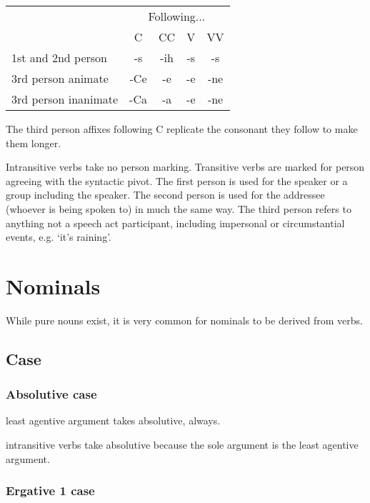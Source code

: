 \documentclass[smallroyalvopaper,9pt]{memoir}
\begin{document}
\begin{table}[ht]
    \centering
    \begin{tabular}{lcccc}
        \toprule
         & \multicolumn{4}{c}{Following...} \\
         & C & CC & V & VV \\
        \midrule
        1st and 2nd person & -s & -ih & -s & -s \\
        3rd person animate & -Ce & -e & -e & -ne \\
        3rd person inanimate & -Ca & -a & -e & -ne \\
        \bottomrule
    \end{tabular}
\end{table}

The third person affixes following C replicate the consonant they follow to make them longer.

Intransitive verbs take no person marking. Transitive verbs are marked for person agreeing with the syntactic pivot. The first person is used for the speaker or a group including the speaker. The second person is used for the addressee (whoever is being spoken to) in much the same way. The third person refers to anything not a speech act participant, including impersonal or circumstantial events, e.g. `it's raining'.

\chapter{Nominals}

While pure nouns exist, it is very common for nominals to be derived from verbs.

\section{Case}

\subsection{Absolutive case}

least agentive argument takes absolutive, always. 

intransitive verbs take absolutive because the sole argument is the least agentive argument.

\subsection{Ergative 1 case}
\end{document}
